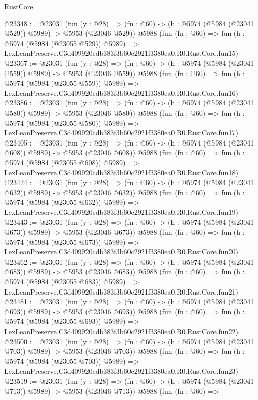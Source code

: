 \begin{lexlean}{RustCore}
\begin{coremodule}
@23348 := @23031
    (fun (y : @28) => (fn : @60) -> (h : @5974 (@5984 (@23041 @529)) @5989) -> @5953 (@23046 @529))
    @5988
    (fun (fn : @60) =>
    fun (h : @5974 (@5984 (@23055 @529)) @5989) =>
    LexLeanPreserve.C3d409920cdb383f3b60c2921f3380ea0.R0.RustCore.fun15)
@23367 := @23031
    (fun (y : @28) => (fn : @60) -> (h : @5974 (@5984 (@23041 @559)) @5989) -> @5953 (@23046 @559))
    @5988
    (fun (fn : @60) =>
    fun (h : @5974 (@5984 (@23055 @559)) @5989) =>
    LexLeanPreserve.C3d409920cdb383f3b60c2921f3380ea0.R0.RustCore.fun16)
@23386 := @23031
    (fun (y : @28) => (fn : @60) -> (h : @5974 (@5984 (@23041 @580)) @5989) -> @5953 (@23046 @580))
    @5988
    (fun (fn : @60) =>
    fun (h : @5974 (@5984 (@23055 @580)) @5989) =>
    LexLeanPreserve.C3d409920cdb383f3b60c2921f3380ea0.R0.RustCore.fun17)
@23405 := @23031
    (fun (y : @28) => (fn : @60) -> (h : @5974 (@5984 (@23041 @608)) @5989) -> @5953 (@23046 @608))
    @5988
    (fun (fn : @60) =>
    fun (h : @5974 (@5984 (@23055 @608)) @5989) =>
    LexLeanPreserve.C3d409920cdb383f3b60c2921f3380ea0.R0.RustCore.fun18)
@23424 := @23031
    (fun (y : @28) => (fn : @60) -> (h : @5974 (@5984 (@23041 @632)) @5989) -> @5953 (@23046 @632))
    @5988
    (fun (fn : @60) =>
    fun (h : @5974 (@5984 (@23055 @632)) @5989) =>
    LexLeanPreserve.C3d409920cdb383f3b60c2921f3380ea0.R0.RustCore.fun19)
@23443 := @23031
    (fun (y : @28) => (fn : @60) -> (h : @5974 (@5984 (@23041 @673)) @5989) -> @5953 (@23046 @673))
    @5988
    (fun (fn : @60) =>
    fun (h : @5974 (@5984 (@23055 @673)) @5989) =>
    LexLeanPreserve.C3d409920cdb383f3b60c2921f3380ea0.R0.RustCore.fun20)
@23462 := @23031
    (fun (y : @28) => (fn : @60) -> (h : @5974 (@5984 (@23041 @683)) @5989) -> @5953 (@23046 @683))
    @5988
    (fun (fn : @60) =>
    fun (h : @5974 (@5984 (@23055 @683)) @5989) =>
    LexLeanPreserve.C3d409920cdb383f3b60c2921f3380ea0.R0.RustCore.fun21)
@23481 := @23031
    (fun (y : @28) => (fn : @60) -> (h : @5974 (@5984 (@23041 @693)) @5989) -> @5953 (@23046 @693))
    @5988
    (fun (fn : @60) =>
    fun (h : @5974 (@5984 (@23055 @693)) @5989) =>
    LexLeanPreserve.C3d409920cdb383f3b60c2921f3380ea0.R0.RustCore.fun22)
@23500 := @23031
    (fun (y : @28) => (fn : @60) -> (h : @5974 (@5984 (@23041 @703)) @5989) -> @5953 (@23046 @703))
    @5988
    (fun (fn : @60) =>
    fun (h : @5974 (@5984 (@23055 @703)) @5989) =>
    LexLeanPreserve.C3d409920cdb383f3b60c2921f3380ea0.R0.RustCore.fun23)
@23519 := @23031
    (fun (y : @28) => (fn : @60) -> (h : @5974 (@5984 (@23041 @713)) @5989) -> @5953 (@23046 @713))
    @5988
    (fun (fn : @60) =>

\end{coremodule}
\end{lexlean}
